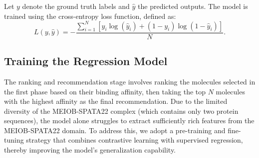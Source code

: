 \documentclass[unnumsec,webpdf,contemporary,large]{oup-authoring-template}%
\theoremstyle{thmstyleone}%
\theoremstyle{thmstyletwo}%
\theoremstyle{thmstylethree}%
\begin{document}
Let $y$ denote the ground truth labels and $\hat{y}$ the predicted outputs. The model is trained using the cross-entropy loss function, defined as:
\begin{equation}
L(y, \hat{y}) = -\frac{\sum_{i=1}^{N} \left[ y_i \log(\hat{y}_i) + (1 - y_i) \log(1 - \hat{y}_i) \right]}{N}.
\end{equation}



\subsection*{Training the Regression Model}

The ranking and recommendation stage involves ranking the molecules selected in the first phase based on their binding affinity, then taking the top $N$ molecules with the highest affinity as the final recommendation. Due to the limited diversity of the MEIOB-SPATA22 complex (which contains only two protein sequences), the model alone struggles to extract sufficiently rich features from the MEIOB-SPATA22 domain. To address this, we adopt a pre-training and fine-tuning strategy that combines contrastive learning with supervised regression, thereby improving the model's generalization capability. 
\end{document}
